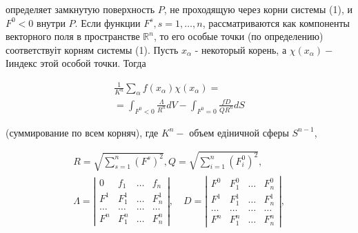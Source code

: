 \documentclass[10pt]{article}
\begin{document}
определяет замкнутую поверхность $P$, не проходящую через корни системы (1), и $F^{0}<0$ внутри $P$. Если функции $F^{s}, s=1, \ldots, n$, рассматриваются как компоненты векторного поля в пространстве $\mathbb{R}^{n}$, то его особые точки (по определению) соответствуіт корням системы (1). Пусть $x_{\alpha}$ - некоторый корень, а $\chi\left(x_{\alpha}\right)-$ Іиндекс этой особой точки. Тогда



\[

\begin{gathered}

\frac{1}{K^{n}} \sum_{\alpha} f\left(x_{\alpha}\right) \chi\left(x_{\alpha}\right)= \\

=\int_{F^{0}<0} \frac{\Lambda}{R^{n}} d V-\int_{F^{0}=0} \frac{f D}{Q R^{n}} d S

\end{gathered}

\]



(суммирование по всем корняч), где $K^{n}-$ объем едіничной сферы $S^{n-1}$,



\[

\begin{gathered}

R=\sqrt{\sum_{s=1}^{n}\left(F^{s}\right)^{2}}, Q=\sqrt{\sum_{i=1}^{n}\left(F_{i}^{0}\right)^{2}}, \\

\Lambda=\left|\begin{array}{llll}

0 & f_{1} & \ldots & f_{n} \\

F^{1} & F_{1}^{1} & \ldots & F_{n}^{1} \\

\ldots & \ldots & \ldots & \ldots \\

F^{n} & F_{1}^{n} & \ldots & F_{n}^{n}

\end{array}\right|, \quad D=\left|\begin{array}{cccc}

F^{0} & F_{1}^{0} & \ldots & F_{n}^{0} \\

F^{1} & F_{1}^{1} & \ldots & F_{n}^{1} \\

\ldots & \ldots & \ldots & \ldots \\

F^{n} & F_{1}^{n} & \ldots & F_{n}^{n}

\end{array}\right|,

\end{gathered}

\]
\end{document}
